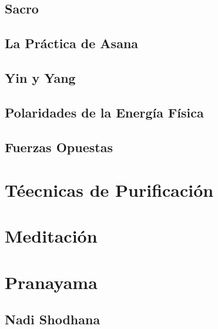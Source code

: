 \subsection{Sacro}
\subsection{La Práctica de Asana}
\subsection{Yin y Yang}
\subsection{Polaridades de la Energía Física}
\subsection{Fuerzas Opuestas}
\section{Téecnicas de Purificación}
\section{Meditación}
\section{Pranayama}
\subsection{Nadi Shodhana}

